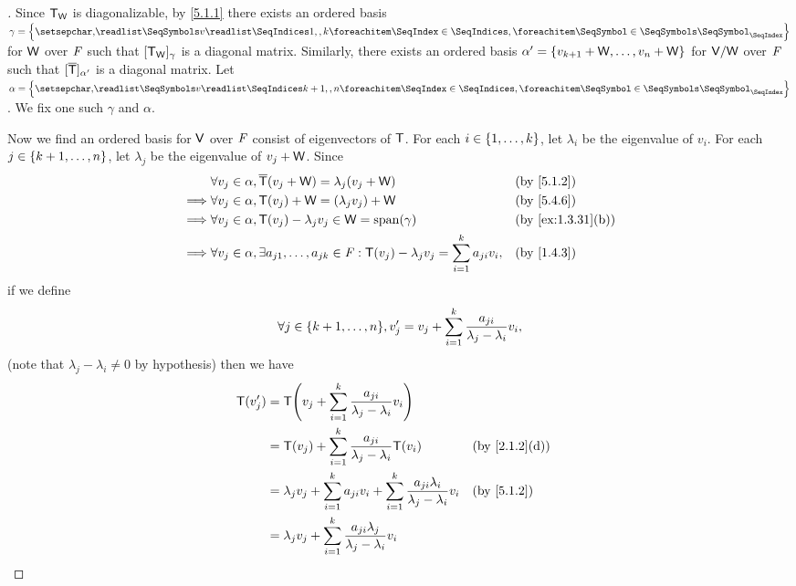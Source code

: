 \begin{proof}[]
	Since \(\mathsf{T}_{\mathsf{W}}\) is diagonalizable, by \cref{5.1.1} there exists an ordered basis \(\gamma = \set{\seq{v}{1,,k}}\) for \(\mathsf{W}\) over \(\mathit{F}\) such that \([\mathsf{T}_{\mathsf{W}}]_{\gamma}\) is a diagonal matrix.
	Similarly, there exists an ordered basis \(\alpha' = \left\lbrace v_{k + 1} + \mathsf{W}, \dots, v_n + \mathsf{W}\right\rbrace\) for \(\mathsf{V} / \mathsf{W}\) over \(\mathit{F}\) such that \([\overline{\mathsf{T}}]_{\alpha'}\) is a diagonal matrix.
	Let \(\alpha = \set{\seq{v}{k+1,,n}}\).
	We fix one such \(\gamma\) and \(\alpha\).

	Now we find an ordered basis for \(\mathsf{V}\) over \(\mathit{F}\) consist of eigenvectors of \(\mathsf{T}\).
	For each \(i \in \left\lbrace1, \dots, k\right\rbrace\), let \(\lambda_i\) be the eigenvalue of \(v_i\).
	For each \(j \in \left\lbrace k + 1, \dots, n\right\rbrace\), let \(\lambda_j\) be the eigenvalue of \(v_j + \mathsf{W}\).
	Since
	\begin{align*}
		         & \forall v_j \in \alpha, \overline{\T}(v_j + \W) = \lambda_j (v_j + \W)                                                 &  & \by{5.1.2}        \\
		\implies & \forall v_j \in \alpha, \T(v_j) + \W = (\lambda_j v_j) + \W                                                            &  & \by{5.4.6}        \\
		\implies & \forall v_j \in \alpha, \T(v_j) - \lambda_j v_j \in \W = \spn{\gamma}                                                  &  & \by{ex:1.3.31}[b] \\
		\implies & \forall v_j \in \alpha, \exists a_{j 1}, \dots, a_{j k} \in \F : \T(v_j) - \lambda_j v_j = \sum_{i = 1}^k a_{j i} v_i, &  & \by{1.4.3}
	\end{align*}
	if we define
	\[
		\forall j \in \set{k + 1, \dots, n}, v_j' = v_j + \sum_{i = 1}^k \frac{a_{j i}}{\lambda_j - \lambda_i} v_i,
	\]
	(note that \(\lambda_j - \lambda_i \neq 0\) by hypothesis)
	then we have
	\begin{align*}
		\T(v_j') & = \T\pa{v_j + \sum_{i = 1}^k \frac{a_{j i}}{\lambda_j - \lambda_i} v_i}                                                              \\
		         & = \T(v_j) + \sum_{i = 1}^k \frac{a_{j i}}{\lambda_j - \lambda_i} \T(v_i)                                          &  & \by{2.1.2}[d] \\
		         & = \lambda_j v_j + \sum_{i = 1}^k a_{j i} v_i + \sum_{i = 1}^k \frac{a_{j i} \lambda_i}{\lambda_j - \lambda_i} v_i &  & \by{5.1.2}    \\
		         & = \lambda_j v_j + \sum_{i = 1}^k \frac{a_{j i} \lambda_j}{\lambda_j - \lambda_i} v_i                                                 \\

\end{align*}
\end{proof}
